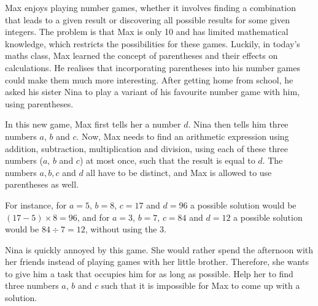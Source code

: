 



%
Max enjoys playing number games, whether it involves finding
a combination that leads to a given
result or discovering all possible results for some given integers.
The problem is that Max is only 10 and has limited
mathematical knowledge, which restricts the possibilities for these games.
Luckily, in today's maths class, Max learned the concept of
parentheses and their effects on calculations. He realises that incorporating parentheses
into his number games could make them much more interesting.
After getting home from school, he asked his sister Nina to play a
variant of his favourite number game with him, using parentheses.

In this new game, Max first tells her a number $d$.
Nina then tells him three numbers $a$, $b$ and $c$. %
Now, Max needs to find an arithmetic expression
using addition, subtraction, multiplication and division, using each of these three
numbers ($a$, $b$ and $c$) at most once, such that the result is equal to $d$.
The numbers $a, b, c$ and $d$ all have to be distinct, and Max is allowed to
use parentheses as well.

For instance, for $a = 5$, $b = 8$, $c = 17$ and $d = 96$ a possible
solution would be $(17 - 5) \times 8 = 96$, and for $a = 3$, $b = 7$, $c = 84$
and $d = 12$ a possible solution would be $84 \div 7 = 12$, without using
the $3$.

Nina is quickly annoyed by this game. She would rather spend the
afternoon with her friends instead of playing games with her little
brother. Therefore, she wants to give him a task that occupies him for as long as possible.
Help her to find three numbers $a$, $b$ and $c$
such that it is impossible for Max to come up with a solution.

